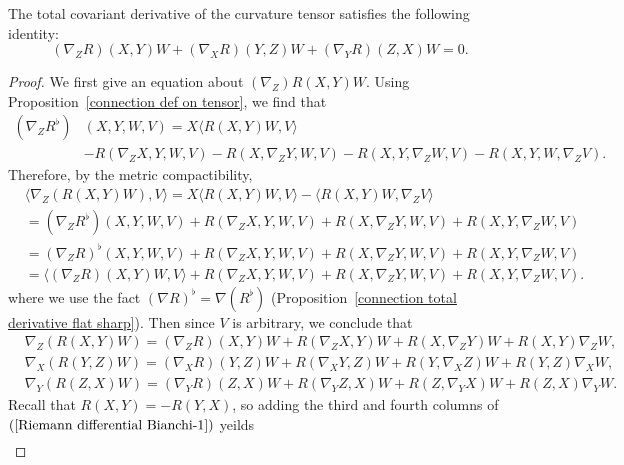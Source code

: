 \begin{proposition}\label{Riemann differential Bianchi}
The total covariant derivative of the curvature tensor satisfies the following identity:
\[(\nabla_ZR)(X,Y)W+(\nabla_XR)(Y,Z)W+(\nabla_{Y}R)(Z,X)W=0.\]
\end{proposition}
\begin{proof}
We first give an equation about $(\nabla_Z)R(X,Y)W$. Using Proposition~\ref{connection def on tensor}, we find that
\begin{equation*}
\begin{aligned}
(\nabla_ZR^{\flat})&(X,Y,W,V)=X\langle R(X,Y)W,V\rangle\\
&-R(\nabla_ZX,Y,W,V)-R(X,\nabla_ZY,W,V)-R(X,Y,\nabla_ZW,V)-R(X,Y,W,\nabla_ZV).
\end{aligned}
\end{equation*}
Therefore, by the metric compactibility,
\begin{equation*}
\begin{aligned}
&\langle\nabla_Z(R(X,Y)W),V\rangle=X\langle R(X,Y)W,V\rangle-\langle R(X,Y)W,\nabla_ZV\rangle\\
&=(\nabla_ZR^{\flat})(X,Y,W,V)+R(\nabla_ZX,Y,W,V)+R(X,\nabla_ZY,W,V)+R(X,Y,\nabla_ZW,V)\\
&=(\nabla_ZR)^{\flat}(X,Y,W,V)+R(\nabla_ZX,Y,W,V)+R(X,\nabla_ZY,W,V)+R(X,Y,\nabla_ZW,V)\\
&=\langle(\nabla_ZR)(X,Y)W,V\rangle+R(\nabla_ZX,Y,W,V)+R(X,\nabla_ZY,W,V)+R(X,Y,\nabla_ZW,V).
\end{aligned}
\end{equation*}
where we use the fact $(\nabla R)^\flat=\nabla(R^\flat)$ (Proposition~\ref{connection total derivative flat sharp}). Then since $V$ is arbitrary, we conclude that
\begin{equation}\label{Riemann differential Bianchi-1}
\begin{aligned}
&\nabla_Z(R(X,Y)W)=(\nabla_ZR)(X,Y)W+R(\nabla_ZX,Y)W+R(X,\nabla_ZY)W+R(X,Y)\nabla_ZW,\\
&\nabla_X(R(Y,Z)W)=(\nabla_XR)(Y,Z)W+R(\nabla_XY,Z)W+R(Y,\nabla_XZ)W+R(Y,Z)\nabla_XW,\\
&\nabla_Y(R(Z,X)W)=(\nabla_YR)(Z,X)W+R(\nabla_YZ,X)W+R(Z,\nabla_YX)W+R(Z,X)\nabla_YW.
\end{aligned}
\end{equation}
Recall that $R(X,Y)=-R(Y,X)$, so adding the third and fourth columns of $(\ref{Riemann differential Bianchi-1})$ yeilds
\begin{align*}

\end{align*}
\end{proof}

